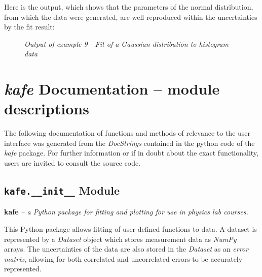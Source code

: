 \documentclass[a4paper,10pt,english]{sphinxmanual}
\begin{document}
Here is the output, which shows that the parameters of the
normal distribution, from which the data were generated, are
well reproduced within the uncertainties by the fit result:
\begin{figure}[htbp]
\centering
\capstart

\caption{\emph{Output of example 9 - Fit of a Gaussian distribution to histogram data}}\end{figure}


\chapter{\emph{kafe} Documentation -- module descriptions}
\label{index:kafe-documentation-module-descriptions}
The following documentation of functions and methods
of relevance to the user interface was generated from
the \emph{DocStrings} contained in the python code of the
\emph{kafe} package.
For further information or if in doubt about the exact
functionality, users are invited to consult the source
code.


\section{\texttt{kafe.\_\_init\_\_} Module}
\label{index:module-kafe.__init__}\label{index:kafe-init-module}
\textbf{kafe} \emph{-- a Python package for fitting and plotting for use in physics lab courses.}

This Python package allows fitting of user-defined functions to data. A dataset
is represented by a \emph{Dataset} object which stores measurement data as \emph{NumPy}
arrays. The uncertainties of the data are also stored in the \emph{Dataset} as an
\emph{error matrix}, allowing for both correlated and uncorrelated errors to be
accurately represented.
\end{document}
